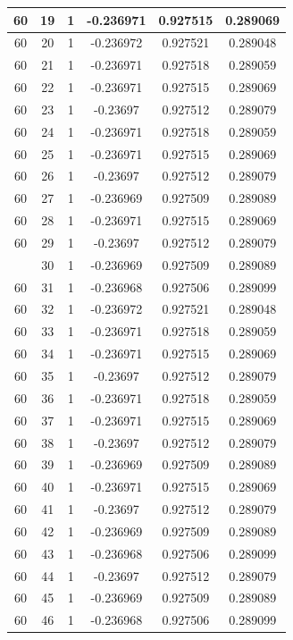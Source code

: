 \documentclass[12pt,a4paper]{article}
\numberwithin{equation}{section}
\numberwithin{figure}{section}
\numberwithin{table}{section}
\begin{document}
\begin{longtable}{|c|c|c|c|c|c|}
60 & 19 & 1 & -0.236971 & 0.927515 & 0.289069 \\ \hline
60 & 20 & 1 & -0.236972 & 0.927521 & 0.289048 \\ \hline
60 & 21 & 1 & -0.236971 & 0.927518 & 0.289059 \\ \hline
60 & 22 & 1 & -0.236971 & 0.927515 & 0.289069 \\ \hline
60 & 23 & 1 & -0.23697 & 0.927512 & 0.289079 \\ \hline
60 & 24 & 1 & -0.236971 & 0.927518 & 0.289059 \\ \hline
60 & 25 & 1 & -0.236971 & 0.927515 & 0.289069 \\ \hline
60 & 26 & 1 & -0.23697 & 0.927512 & 0.289079 \\ \hline
60 & 27 & 1 & -0.236969 & 0.927509 & 0.289089 \\ \hline
60 & 28 & 1 & -0.236971 & 0.927515 & 0.289069 \\ \hline
60 & 29 & 1 & -0.23697 & 0.927512 & 0.289079 \\ \hline
\pagebreak
60 & 30 & 1 & -0.236969 & 0.927509 & 0.289089 \\ \hline
60 & 31 & 1 & -0.236968 & 0.927506 & 0.289099 \\ \hline
60 & 32 & 1 & -0.236972 & 0.927521 & 0.289048 \\ \hline
60 & 33 & 1 & -0.236971 & 0.927518 & 0.289059 \\ \hline
60 & 34 & 1 & -0.236971 & 0.927515 & 0.289069 \\ \hline
60 & 35 & 1 & -0.23697 & 0.927512 & 0.289079 \\ \hline
60 & 36 & 1 & -0.236971 & 0.927518 & 0.289059 \\ \hline
60 & 37 & 1 & -0.236971 & 0.927515 & 0.289069 \\ \hline
60 & 38 & 1 & -0.23697 & 0.927512 & 0.289079 \\ \hline
60 & 39 & 1 & -0.236969 & 0.927509 & 0.289089 \\ \hline
60 & 40 & 1 & -0.236971 & 0.927515 & 0.289069 \\ \hline
60 & 41 & 1 & -0.23697 & 0.927512 & 0.289079 \\ \hline
60 & 42 & 1 & -0.236969 & 0.927509 & 0.289089 \\ \hline
60 & 43 & 1 & -0.236968 & 0.927506 & 0.289099 \\ \hline
60 & 44 & 1 & -0.23697 & 0.927512 & 0.289079 \\ \hline
60 & 45 & 1 & -0.236969 & 0.927509 & 0.289089 \\ \hline
60 & 46 & 1 & -0.236968 & 0.927506 & 0.289099 \\ \hline

\end{longtable}
\end{document}
